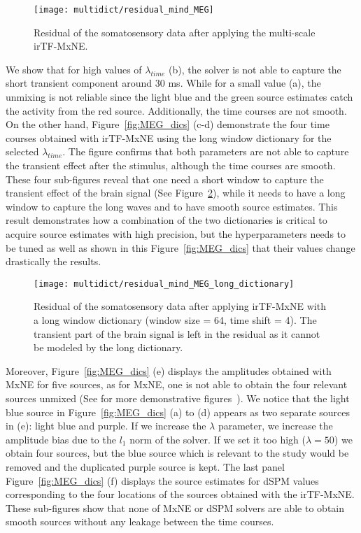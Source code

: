 \begin{figure}
\centering
	\texttt{[image: multidict/residual\_mind\_MEG]}
    \caption{Residual of the somatosensory data after applying the multi-scale irTF-MxNE.}
    \label{fig:residual_mind}
\end{figure}

We show that for high values of $\lambda_{time}$ (b), the solver is not able to capture the short transient component around 30 ms. While for a small value (a), the unmixing is not reliable since the light blue and the green source estimates catch the activity from the red source. Additionally, the time courses are not smooth. On the other hand, Figure~\ref{fig:MEG_dics} (c-d) demonstrate the four time courses obtained with irTF-MxNE using the long window dictionary for the selected $\lambda_{time}$. The figure confirms that both parameters are not able to capture the transient effect after the stimulus, although the time courses are smooth. These four sub-figures reveal that one need a short window to capture the transient effect of the brain signal (See Figure~\ref{fig:residual_long_dic}), while it needs to have a long window to capture the long waves and to have smooth source estimates. This result demonstrates how a combination of the two dictionaries is critical to acquire source estimates with high precision, but the hyperparameters needs to be tuned as well as shown in this Figure~\ref{fig:MEG_dics} that their values change drastically the results.

\begin{figure}
\centering
	\texttt{[image: multidict/residual\_mind\_MEG\_long\_dictionary]}
    \caption{Residual of the somatosensory data after applying irTF-MxNE with a long window dictionary (window size = 64, time shift = 4). The transient part of the brain signal is left in the residual as it cannot be modeled by the long dictionary.}
    \label{fig:residual_long_dic}
\end{figure}

Moreover, Figure~\ref{fig:MEG_dics} (e) displays the amplitudes obtained with MxNE for five sources, as for MxNE, one is not able to obtain the four relevant sources unmixed (See for more demonstrative figures~\cite{gramfort2012mixed}). We notice that the light blue source in Figure~\ref{fig:MEG_dics} (a) to (d) appears as two separate sources in (e): light blue and purple. If we increase the $\lambda$ parameter, we increase the amplitude bias due to the $l_1$ norm of the solver. If we set it too high ($\lambda=50$) we obtain four sources, but the blue source which is relevant to the study would be removed and the duplicated purple source is kept. The last panel Figure~\ref{fig:MEG_dics} (f) displays the source estimates for dSPM values corresponding to the four locations of the sources obtained with the irTF-MxNE. These sub-figures show that none of MxNE or dSPM solvers are able to obtain smooth sources without any leakage between the time courses.

